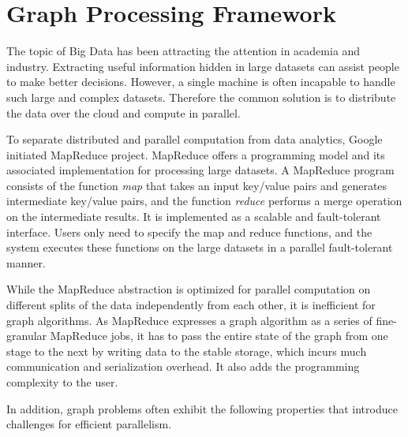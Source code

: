 \chapter{Graph Processing Framework}
\label{chap:c2}

The topic of Big Data has been attracting the attention in academia and industry. Extracting useful information hidden in large datasets can assist people to make better decisions. However, a single machine is often incapable to handle such large and complex datasets. Therefore the common solution is to distribute the data over the cloud and compute in parallel.

To separate distributed and parallel computation from data analytics, Google initiated MapReduce project. MapReduce offers a programming model and its associated implementation for processing large datasets\cite{dean2008mapreduce}. A MapReduce program consists of the function \emph{map} that takes an input key/value pairs and generates intermediate key/value pairs, and the function \emph{reduce} performs a merge operation on the intermediate results. It is implemented as a scalable and fault-tolerant interface. Users only need to specify the map and reduce functions, and the system executes these functions on the large datasets in a parallel fault-tolerant manner.

While the MapReduce abstraction is optimized for parallel computation on different splits of the data independently from each other, it is inefficient for graph algorithms. As MapReduce expresses a graph algorithm as a series of fine-granular MapReduce jobs, it has to pass the entire state of the graph from one stage to the next by writing data to the stable storage, which incurs much communication and serialization overhead. It also adds the programming complexity to the user. 

In addition, graph problems often exhibit the following properties that introduce challenges for efficient parallelism\cite{lumsdaine2007challenges}.

